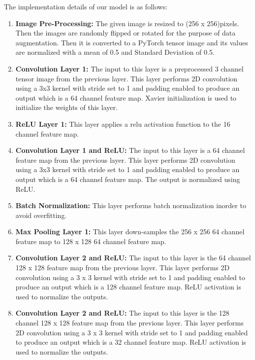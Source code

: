 \documentclass[12pt]{article}
\begin{document}
\newpage

The implementation details of our model is as follows: 
\begin{enumerate}
	\item \textbf{Image Pre-Processing: } The given image is resized to (256 x 256)pixels. Then the images are randomly flipped or rotated for the purpose of data augmentation. Then it is converted to a PyTorch tensor image and its values are normalized with a mean of 0.5 and Standard Deviation of 0.5.   
  
	\item \textbf{Convolution Layer 1:} The input to this layer is a preprocessed 3 channel tensor image from the previous layer. This layer performs 2D convolution using a 3x3 kernel with stride set to 1 and padding enabled to produce an output which is a 64 channel feature map. Xavier initialization is used to initialize the weights of this layer. 
	
	\item \textbf{ReLU Layer 1:} This layer applies a relu activation function to the 16 channel feature map.

	\item \textbf{Convolution Layer 1 and ReLU:} The input to this layer is a 64 channel feature map from the previous layer. This layer performs 2D convolution using a 3x3 kernel with stride set to 1 and padding enabled to produce an output which is a 64 channel feature map. The output is normalized using ReLU.  

	 \item \textbf{Batch Normalization: } This layer performs batch normalization inorder to avoid overfitting. 	
	 	 
	 \item \textbf{Max Pooling Layer 1:} This layer down-samples the 256 x 256 64 channel feature map to 128 x 128 64 channel feature map.
	 
	 \item \textbf{Convolution Layer 2 and ReLU:} The input to this layer is the 64 channel 128 x 128 feature map from the previous layer. This layer performs 2D convolution using a 3 x 3 kernel with stride set to 1 and padding enabled to produce an output which is a 128 channel feature map. ReLU activation is used to normalize the outputs.  
	 
	 \item \textbf{Convolution Layer 2 and ReLU:} The input to this layer is the 128 channel 128 x 128 feature map from the previous layer. This layer performs 2D convolution using a 3 x 3 kernel with stride set to 1 and padding enabled to produce an output which is a 32 channel feature map. ReLU activation is used to normalize the outputs.  
	 

\end{enumerate}
\end{document}
